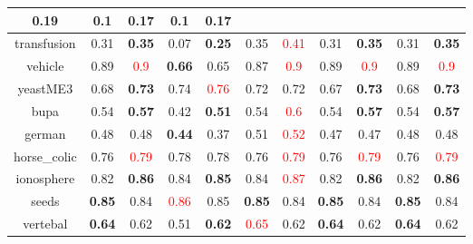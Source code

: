 \documentclass{article}%
\begin{document}
\begin{tabular}{c|cccccccccc}
{0.19
}&0.1&\textbf{0.17}&0.1&\textbf{0.17}\\%
\hline%
transfusion&0.31&\textbf{0.35}&0.07&\textbf{0.25}&0.35&\textcolor{red}{ 
0.41
}&0.31&\textbf{0.35}&0.31&\textbf{0.35}\\%
\hline%
vehicle&0.89&\textcolor{red}{ 
0.9
}&\textbf{0.66}&0.65&0.87&\textcolor{red}{ 
0.9
}&0.89&\textcolor{red}{ 
0.9
}&0.89&\textcolor{red}{ 
0.9
}\\%
\hline%
yeastME3&0.68&\textbf{0.73}&0.74&\textcolor{red}{ 
0.76
}&0.72&0.72&0.67&\textbf{0.73}&0.68&\textbf{0.73}\\%
\hline%
bupa&0.54&\textbf{0.57}&0.42&\textbf{0.51}&0.54&\textcolor{red}{ 
0.6
}&0.54&\textbf{0.57}&0.54&\textbf{0.57}\\%
\hline%
german&0.48&0.48&\textbf{0.44}&0.37&0.51&\textcolor{red}{ 
0.52
}&0.47&0.47&0.48&0.48\\%
\hline%
horse\_colic&0.76&\textcolor{red}{ 
0.79
}&0.78&0.78&0.76&\textcolor{red}{ 
0.79
}&0.76&\textcolor{red}{ 
0.79
}&0.76&\textcolor{red}{ 
0.79
}\\%
\hline%
ionosphere&0.82&\textbf{0.86}&0.84&\textbf{0.85}&0.84&\textcolor{red}{ 
0.87
}&0.82&\textbf{0.86}&0.82&\textbf{0.86}\\%
\hline%
seeds&\textbf{0.85}&0.84&\textcolor{red}{ 
0.86
}&0.85&\textbf{0.85}&0.84&\textbf{0.85}&0.84&\textbf{0.85}&0.84\\%
\hline%
vertebal&\textbf{0.64}&0.62&0.51&\textbf{0.62}&\textcolor{red}{ 
0.65
}&0.62&\textbf{0.64}&0.62&\textbf{0.64}&0.62\\%
\hline%
\end{tabular}

%
\end{document}
